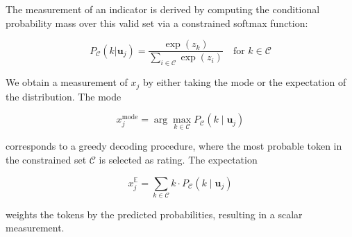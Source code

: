 The measurement of an indicator is derived by computing the conditional probability mass over this valid set via a constrained softmax function:

\begin{equation}
    P_{\mathcal{C}}(k | \mathbf{u}_j) = \frac{\exp(z_k)}{\sum_{i \in \mathcal{C}} \exp(z_i)} \quad \text{for } k \in \mathcal{C}
\end{equation}


We obtain a measurement of $x_j$ by either taking the mode or the expectation of the distribution. The mode


\begin{equation}
x_j^{\text{mode}} = \arg\max_{k \in \mathcal{C}} P_{\mathcal{C}}(k \mid \mathbf{u}_j)
\end{equation}

corresponds to a greedy decoding procedure, where the most probable token in the constrained set $\mathcal{C}$ is selected as rating. The expectation 

\begin{equation}
x_j^{\mathbb{E}} = \sum_{k \in \mathcal{C}} k \cdot P_{\mathcal{C}}(k \mid \mathbf{u}_j)
\end{equation}

weights the tokens by the predicted probabilities, resulting in a scalar measurement. 









